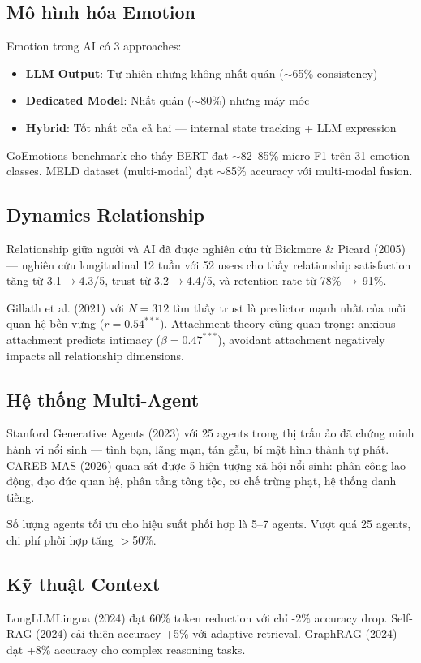 \subsection{Mô hình hóa Emotion}

Emotion trong AI có 3 approaches:
\begin{itemize}
    \item \textbf{LLM Output}: Tự nhiên nhưng không nhất quán ($\sim$65\% consistency)
    \item \textbf{Dedicated Model}: Nhất quán ($\sim$80\%) nhưng máy móc
    \item \textbf{Hybrid}: Tốt nhất của cả hai --- internal state tracking + LLM expression
\end{itemize}

GoEmotions benchmark cho thấy BERT đạt $\sim$82--85\% micro-F1 trên 31 emotion classes. MELD dataset (multi-modal) đạt $\sim$85\% accuracy với multi-modal fusion.

\subsection{Dynamics Relationship}

Relationship giữa người và AI đã được nghiên cứu từ Bickmore \& Picard (2005) --- nghiên cứu longitudinal 12 tuần với 52 users cho thấy relationship satisfaction tăng từ 3.1$\to$4.3/5, trust từ 3.2$\to$4.4/5, và retention rate từ 78\%\,$\to$\,91\%.

Gillath et al. (2021) với $N=312$ tìm thấy trust là predictor mạnh nhất của mối quan hệ bền vững ($r=0.54^{***}$). Attachment theory cũng quan trọng: anxious attachment predicts intimacy ($\beta=0.47^{***}$), avoidant attachment negatively impacts all relationship dimensions.

\subsection{Hệ thống Multi-Agent}

Stanford Generative Agents (2023) với 25 agents trong thị trấn ảo đã chứng minh hành vi nổi sinh --- tình bạn, lãng mạn, tán gẫu, bí mật hình thành tự phát. CAREB-MAS (2026) quan sát được 5 hiện tượng xã hội nổi sinh: phân công lao động, đạo đức quan hệ, phân tầng tông tộc, cơ chế trừng phạt, hệ thống danh tiếng.

Số lượng agents tối ưu cho hiệu suất phối hợp là 5--7 agents. Vượt quá 25 agents, chi phí phối hợp tăng $>$50\%.

\subsection{Kỹ thuật Context}

LongLLMLingua (2024) đạt 60\% token reduction với chỉ -2\% accuracy drop. Self-RAG (2024) cải thiện accuracy +5\% với adaptive retrieval. GraphRAG (2024) đạt +8\% accuracy cho complex reasoning tasks.

